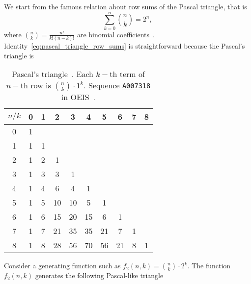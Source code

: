 We start from the famous relation about row sums of the Pascal triangle, that is
\begin{equation}
    \sum_{k=0}^{n}\binom{n}{k} = 2^n,
    \label{eq:pascal_triangle_row_sums}
\end{equation}
where $\binom{n}{k} = \frac{n!}{k!(n-k)!}$ are binomial coefficients~\cite{graham1989concrete}.
Identity~\eqref{eq:pascal_triangle_row_sums} is straightforward because the Pascal's triangle is
\begin{table}[H]
    \begin{tabular}{c|ccccccccc}
        $n/k$ & 0 & 1 & 2  & 3  & 4  & 5  & 6  & 7 & 8 \\ [3px]
        \hline
        0     & 1 &   &    &    &    &    &    &   &   \\
        1     & 1 & 1 &    &    &    &    &    &   &   \\
        2     & 1 & 2 & 1  &    &    &    &    &   &   \\
        3     & 1 & 3 & 3  & 1  &    &    &    &   &   \\
        4     & 1 & 4 & 6  & 4  & 1  &    &    &   &   \\
        5     & 1 & 5 & 10 & 10 & 5  & 1  &    &   &   \\
        6     & 1 & 6 & 15 & 20 & 15 & 6  & 1  &   &   \\
        7     & 1 & 7 & 21 & 35 & 35 & 21 & 7  & 1 &   \\
        8     & 1 & 8 & 28 & 56 & 70 & 56 & 21 & 8 & 1 \\
    \end{tabular}
    \caption{Pascal's triangle~\cite{conway1996pascal}.
    Each $k-$th term of $n-$th row is $\binom{n}{k}\cdot 1^k$.
    Sequence \href{https://oeis.org/A007318}{\texttt{A007318}} in OEIS~\cite{Sloane_theencyclopedia}.} \label{tab:pascal_triagnle}
\end{table}
Consider a generating function such as $f_2(n,k) = \binom{n}{k}\cdot 2^k$.
The function $f_2(n,k)$ generates the following Pascal-like triangle
